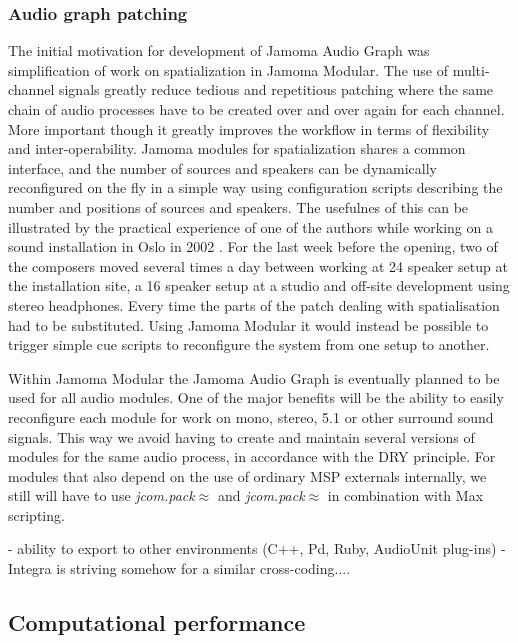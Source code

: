 \documentclass[twoside,a4paper]{article}
\begin{document}

\subsubsection{Audio graph patching} %


The initial motivation for development of Jamoma Audio Graph was simplification of work on spatialization in Jamoma Modular. 
The use of multi-channel signals greatly reduce tedious and repetitious patching where the same chain of audio processes have to be created over and over again for each channel. 
More important though it greatly improves the workflow in terms of flexibility and inter-operability.
Jamoma modules for spatialization shares a common interface, and the number of sources and speakers can be dynamically reconfigured on the fly in a simple way using configuration scripts describing the number and positions of sources and speakers. 
The usefulnes of this can be illustrated by the practical experience of one of the authors while working on a sound installation in Oslo in 2002 \cite{Rudi:2003}.
For the last week before the opening, two of the composers moved several times a day between working at 24 speaker setup at the installation site, a 16 speaker setup at a studio and off-site development using stereo headphones.
Every time the parts of the patch dealing with spatialisation had to be substituted.
Using Jamoma Modular it would instead be possible to trigger simple cue scripts to reconfigure the system from one setup to another.

Within Jamoma Modular the Jamoma Audio Graph is eventually planned to be used for all audio modules.
One of the major benefits will be the ability to easily reconfigure each module for work on mono, stereo, 5.1 or other surround sound signals.
This way we avoid having to create and maintain several versions of modules for the same audio process, in accordance with the DRY principle.
For modules that also depend on the use of ordinary MSP externals internally, we still will have to use \emph{jcom.pack$\approx$} and \emph{jcom.pack$\approx$} in combination with Max scripting.



- ability to export to other environments (C++, Pd, Ruby, AudioUnit plug-ins)
- Integra is striving somehow for a similar cross-coding....



\subsection{Computational performance} %
\end{document}
